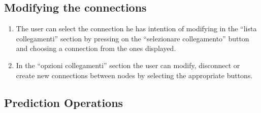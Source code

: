 \subsection{Modifying the connections}
	\begin{enumerate}
		\item The user can select the connection he has intention of modifying in the “lista collegamenti” section by pressing on the “selezionare collegamento” button and choosing a connection from the ones displayed.
		\item In the “opzioni collegamenti” section the user can modify, disconnect or create new connections between nodes by selecting the appropriate buttons.
	\end{enumerate}
\subsection{Prediction Operations}
